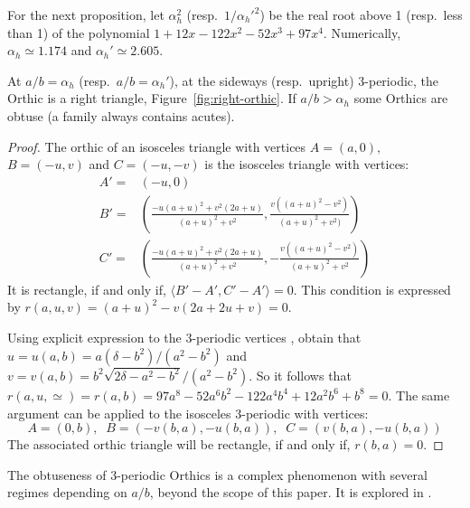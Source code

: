 For the next proposition, 
let $\alpha_h^2$ (resp.~$1/\alpha_h'^2$) be the real root above 1 (resp.~less than 1) of the polynomial $1 + 12 x - 122 x^2 - 52 x^3 + 97 x^4$. Numerically, $\alpha_h{\simeq}1.174$ and $\alpha_h'{\simeq}2.605$.



\begin{proposition}
At $a/b=\alpha_h$ (resp.~$a/b=\alpha_h'$), at the sideways (resp.~upright) 3-periodic, the Orthic is a right triangle, Figure~\ref{fig:right-orthic}. If $a/b>\alpha_h$ some Orthics are obtuse (a family always contains acutes).
\end{proposition}

\begin{proof}
The orthic of an isosceles triangle with vertices $A=(a,0),$ $B=(-u,v)$ and $C=(-u,-v)$ is the isosceles triangle with vertices:
\begin{align*}
A'=&(-u,0)\\
B'=&\left(\frac{-u(a+u)^2+v^2(2a+u) }{(a+u)^2+v^2},\frac{ v( (a+u)^2-v^2)}{(a+u)^2+v^2)}\right)\\
C'=&\left(\frac{-u(a+u)^2+v^2(2a+u) }{(a+u)^2+v^2},- \frac{v( (a+u)^2-v^2)}{(a+u)^2+v^2}\right)
\end{align*}
%
It is rectangle, if and only if, $\langle B'-A',C' -A'\rangle=0$. This condition is expressed by
$r(a,u,v)=(a+u)^2-v(2a+2u+v)=0.$

Using explicit expression to the 3-periodic vertices \cite{garcia2019-incenter}, obtain that  
$u= u(a,b)=a (\delta- {b}^{2})/({a}^{2}-{b}^{2})$ and $v=v(a,b)={b}^{2}\sqrt {2\delta-{a}^{2}-{b}^{2} 
}/({a}^{2}-{b}^{2}).
$
So it follows that $r(a,u,\simeq)=r(a,b)=97a^8-52a^6b^2-122a^4b^4+12a^2b^6+b^8=0.$
The same argument can be applied to the isosceles 3-periodic with vertices:
%
\begin{equation*}
    A=(0,b),\;\;B=(-v(b,a),-u(b,a)),\;\;C=(v(b,a),-u(b,a))
\end{equation*}
%
\noindent The associated orthic triangle will be rectangle, if and only if, $r(b,a)=0$.
\end{proof}


The obtuseness of 3-periodic Orthics is a complex phenomenon with several regimes depending on $a/b$, beyond the scope of this paper. It is explored in  \cite[PL\#08]{reznik2020-playlist-intriguing}.

